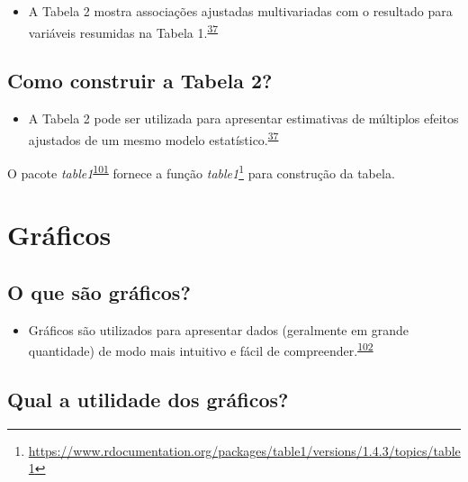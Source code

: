 \documentclass[
  a4paper,
]{book}
\providecommand{\tightlist}{%
  \setlength{\itemsep}{0pt}\setlength{\parskip}{0pt}}
\renewcommand{\href}[2]{#2\footnote{\url{#1}}}
\newenvironment{infobox}[1]
  {
  \begin{itemize}
  \renewcommand{\labelitemi}{
    \raisebox{-.7\height}[0pt][0pt]{
      {\setkeys{Gin}{width=3em,keepaspectratio}
        \texttt{[image: \#1]}}
    }
  }
  \setlength{\fboxsep}{1em}
  \begin{blackbox}
  \item
  }
  {
  \end{blackbox}
  \end{itemize}
  }
\begin{document}
\begin{itemize}
\tightlist
\item
  A Tabela 2 mostra associações ajustadas multivariadas com o resultado para variáveis resumidas na Tabela 1.\textsuperscript{\protect\hyperlink{ref-Westreich2013}{37}}
\end{itemize}

\hypertarget{como-construir-a-tabela-2}{%
\subsection{Como construir a Tabela 2?}\label{como-construir-a-tabela-2}}

\begin{itemize}
\tightlist
\item
  A Tabela 2 pode ser utilizada para apresentar estimativas de múltiplos efeitos ajustados de um mesmo modelo estatístico.\textsuperscript{\protect\hyperlink{ref-Westreich2013}{37}}
\end{itemize}

\begin{infobox}{images/Rlogo}
O pacote \emph{table1}\textsuperscript{\protect\hyperlink{ref-table1}{101}} fornece a função \href{https://www.rdocumentation.org/packages/table1/versions/1.4.3/topics/table1}{\emph{table1}} para construção da tabela.

\end{infobox}

\hypertarget{graficos}{%
\section{Gráficos}\label{graficos}}

\hypertarget{o-que-suxe3o-gruxe1ficos}{%
\subsection{O que são gráficos?}\label{o-que-suxe3o-gruxe1ficos}}

\begin{itemize}
\tightlist
\item
  Gráficos são utilizados para apresentar dados (geralmente em grande quantidade) de modo mais intuitivo e fácil de compreender.\textsuperscript{\protect\hyperlink{ref-Park2022}{102}}
\end{itemize}

\hypertarget{qual-a-utilidade-dos-gruxe1ficos}{%
\subsection{Qual a utilidade dos gráficos?}\label{qual-a-utilidade-dos-gruxe1ficos}}
\end{document}
